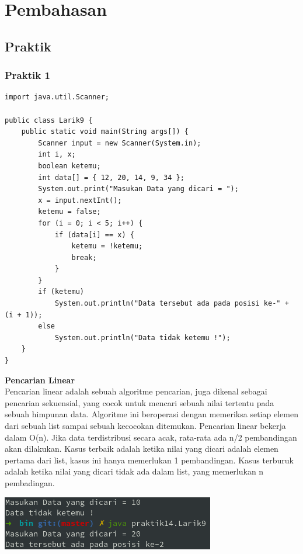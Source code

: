 \documentclass[a4paper,12pt]{article}
\begin{document}
\newpage

\section{Pembahasan}
\subsection{Praktik}
\subsubsection{Praktik 1}
\begin{lstlisting}
import java.util.Scanner;

public class Larik9 {
    public static void main(String args[]) {
        Scanner input = new Scanner(System.in);
        int i, x;
        boolean ketemu;
        int data[] = { 12, 20, 14, 9, 34 };
        System.out.print("Masukan Data yang dicari = ");
        x = input.nextInt();
        ketemu = false;
        for (i = 0; i < 5; i++) {
            if (data[i] == x) {
                ketemu = !ketemu;
                break;
            }
        }
        if (ketemu)
            System.out.println("Data tersebut ada pada posisi ke-" + (i + 1));
        else
            System.out.println("Data tidak ketemu !");
    }
}
\end{lstlisting}

\textbf{Pencarian Linear\\}
Pencarian linear adalah sebuah algoritme pencarian, juga dikenal sebagai pencarian sekuensial, yang cocok untuk mencari
sebuah nilai tertentu pada sebuah himpunan data. 
Algoritme ini beroperasi dengan memeriksa setiap elemen dari sebuah list sampai sebuah kecocokan ditemukan. Pencarian
linear bekerja dalam O(n). Jika data terdistribusi secara acak, rata-rata ada n/2 pembandingan akan dilakukan. Kasus
terbaik adalah ketika nilai yang dicari adalah elemen pertama dari list, kasus ini hanya memerlukan 1 pembandingan.
Kasus terburuk adalah ketika nilai yang dicari tidak ada dalam list, yang memerlukan n pembadingan.

\begin{center}
    \includegraphics[scale=1]{1.png} 
\end{center}
\end{document}
